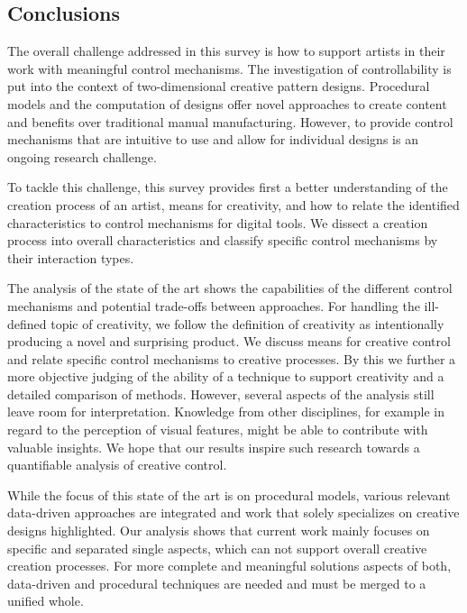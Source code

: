 

\subsection{Conclusions}



The overall challenge addressed in this survey is how to support artists in their work with meaningful control mechanisms. The investigation of controllability is put into the context of two-dimensional creative pattern designs. Procedural models and the computation of designs offer novel approaches to create content and benefits over traditional manual manufacturing. However, to provide control mechanisms that are intuitive to use and allow for individual designs is an ongoing research challenge.

To tackle this challenge, this survey provides first a better understanding of the creation process of an artist, means for creativity, and how to relate the identified characteristics to control mechanisms for digital tools. We dissect a creation process into overall characteristics and classify specific control mechanisms by their interaction types. 

The analysis of the state of the art shows the capabilities of the different control mechanisms and potential trade-offs between approaches. For handling the ill-defined topic of creativity, we follow the definition of creativity as intentionally producing a novel and surprising product. We discuss means for creative control and relate specific control mechanisms to creative processes. By this we further a more objective judging of the ability of a technique to support creativity and a detailed comparison of methods. However, several aspects of the analysis still leave room for interpretation. Knowledge from other disciplines, for example in regard to the perception of visual features, might be able to contribute with valuable insights. We hope that our results inspire such research towards a quantifiable analysis of creative control.

While the focus of this state of the art is on procedural models, various relevant data-driven approaches are integrated and work that solely specializes on creative designs highlighted. Our analysis shows that current work mainly focuses on specific and separated single aspects, which can not support overall creative creation processes. For more complete and meaningful solutions aspects of both, data-driven and procedural techniques are needed and must be merged to a unified whole.